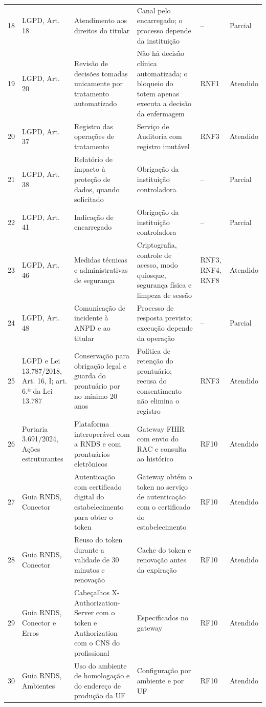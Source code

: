 {\begin{longtable}{L{0.5cm} L{1.9cm} L{3.6cm} L{4.3cm} L{1.3cm} L{1.6cm}}
18 & LGPD, Art. 18 & Atendimento aos direitos do titular & Canal pelo encarregado; o processo depende da instituição & -- & Parcial \\
19 & LGPD, Art. 20 & Revisão de decisões tomadas unicamente por tratamento automatizado & Não há decisão clínica automatizada; o bloqueio do totem apenas executa a decisão da enfermagem & RNF1 & Atendido \\
20 & LGPD, Art. 37 & Registro das operações de tratamento & Serviço de Auditoria com registro imutável & RNF3 & Atendido \\
21 & LGPD, Art. 38 & Relatório de impacto à proteção de dados, quando solicitado & Obrigação da instituição controladora & -- & Parcial \\
22 & LGPD, Art. 41 & Indicação de encarregado & Obrigação da instituição controladora & -- & Parcial \\
23 & LGPD, Art. 46 & Medidas técnicas e administrativas de segurança & Criptografia, controle de acesso, modo quiosque, segurança física e limpeza de sessão & RNF3, RNF4, RNF8 & Atendido \\
24 & LGPD, Art. 48 & Comunicação de incidente à ANPD e ao titular & Processo de resposta previsto; execução depende da operação & -- & Parcial \\
25 & LGPD e Lei 13.787/2018, Art. 16, I; art. 6.º da Lei 13.787 & Conservação para obrigação legal e guarda do prontuário por no mínimo 20 anos & Política de retenção do prontuário; recusa do consentimento não elimina o registro & RNF3 & Atendido \\
26 & Portaria 3.691/2024, Ações estruturantes & Plataforma interoperável com a RNDS e com prontuários eletrônicos & Gateway FHIR com envio do RAC e consulta ao histórico & RF10 & Atendido \\
27 & Guia RNDS, Conector & Autenticação com certificado digital do estabelecimento para obter o token & Gateway obtém o token no serviço de autenticação com o certificado do estabelecimento & RF10 & Atendido \\
28 & Guia RNDS, Conector & Reuso do token durante a validade de 30 minutos e renovação & Cache do token e renovação antes da expiração & RF10 & Atendido \\
29 & Guia RNDS, Conector e Erros & Cabeçalhos X-Authorization-Server com o token e Authorization com o CNS do profissional & Especificados no gateway & RF10 & Atendido \\
30 & Guia RNDS, Ambientes & Uso do ambiente de homologação e do endereço de produção da UF & Configuração por ambiente e por UF & RF10 & Atendido \\

\end{longtable}}
